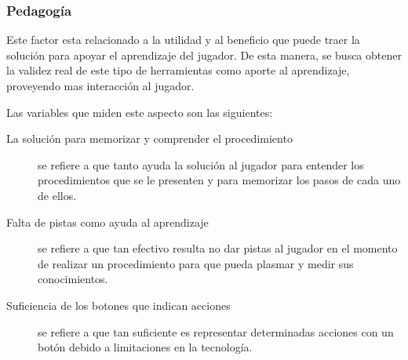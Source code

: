 \subsubsection{Pedagogía}
\label{sec:sub_pedagogia}

Este factor esta relacionado a la utilidad y al beneficio que puede traer la
solución para apoyar el aprendizaje del jugador. De esta manera, se busca
obtener la validez real de este tipo de herramientas como aporte al aprendizaje,
proveyendo mas interacción al jugador.

Las variables que miden este aspecto son las siguientes:

\begin{description}

\item[La solución para memorizar y comprender el procedimiento] se refiere a
    que tanto ayuda la solución al jugador para entender los procedimientos que se
    le presenten y para memorizar los pasos de cada uno de ellos.

\item[Falta de pistas como ayuda al aprendizaje] se refiere a que tan efectivo
    resulta no dar pistas al jugador en el momento de realizar un procedimiento
    para que pueda plasmar y medir sus conocimientos.

\item[Suficiencia de los botones que indican acciones] se refiere a que tan
    suficiente es representar determinadas acciones  con un botón debido a
    limitaciones en la tecnología.

\end{description}
